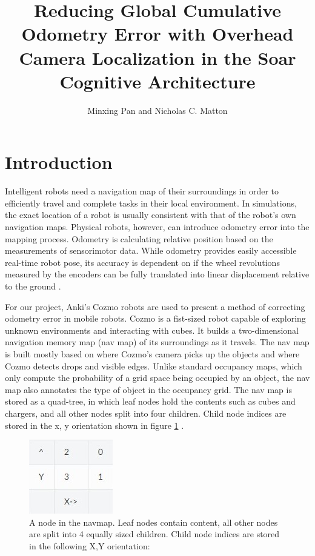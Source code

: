 \documentclass[jou,apacite]{apa6}
\title{Reducing Global Cumulative Odometry Error with Overhead Camera Localization in the Soar Cognitive Architecture}
\author{Minxing Pan and Nicholas C. Matton}
\affiliation{The University of Michigan}
\begin{document}
\maketitle

\section{Introduction}
Intelligent robots need a navigation map of their surroundings in order to efficiently travel and complete tasks in their local environment. In simulations, the exact location of a robot is usually consistent with that of the robot’s own navigation maps. Physical robots, however, can introduce odometry error into the mapping process. Odometry is calculating relative position based on the measurements of sensorimotor data. While odometry provides easily accessible real-time robot pose, its accuracy is dependent on if the wheel revolutions measured by the encoders can be fully translated into linear displacement relative to the ground \cite{Borenstein}.

For our project, Anki’s Cozmo robots are used to present a method of correcting odometry error in mobile robots. Cozmo is a fist-sized robot capable of exploring unknown environments and interacting with cubes. It builds a two-dimensional navigation memory map (nav map) of its surroundings as it travels. The nav map is built mostly based on where Cozmo’s camera picks up the objects and where Cozmo detects drops and visible edges. Unlike standard occupancy maps, which only compute the probability of a grid space being occupied by an object, the nav map also annotates the type of object in the occupancy grid. The nav map is stored as a quad-tree, in which leaf nodes hold the contents such as cubes and chargers, and all other nodes split into four children. Child node indices are stored in the x, y orientation shown in figure \ref{fig:navmap} \cite{Anki}.

\begin{figure}
	\begin{center}
		\includegraphics[scale=1]{navmap.jpg}
	\end{center}
	\caption{A node in the navmap.
		Leaf nodes contain content, all other nodes are split into 4 equally sized children. Child node indices are stored in the following X,Y orientation:}
	\label{fig:navmap}
\end{figure}
\end{document}
